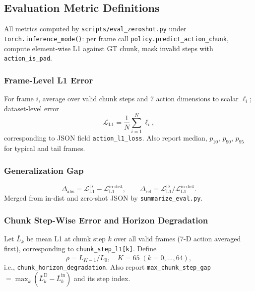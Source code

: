 \documentclass[10pt,twocolumn,letterpaper]{article}
\begin{document}
\subsection{Evaluation Metric Definitions}

All metrics computed by \texttt{scripts/eval\_zeroshot.py} under \texttt{torch.inference\_mode()}: per frame call \texttt{policy.predict\_action\_chunk}, compute element-wise L1 against GT chunk, mask invalid steps with \texttt{action\_is\_pad}.

\subsubsection{Frame-Level L1 Error}

For frame $i$, average over valid chunk steps and 7 action dimensions to scalar $\ell_i$; dataset-level error
\begin{equation}
  \mathcal{L}_{\mathrm{L1}} = \frac{1}{N}\sum_{i=1}^{N} \ell_i,
  \label{eq:l1}
\end{equation}
corresponding to JSON field \texttt{action\_l1\_loss}. Also report median, $p_{10}$, $p_{90}$, $p_{95}$ for typical and tail frames.

\subsubsection{Generalization Gap}

\begin{equation}
  \Delta_{\mathrm{abs}} = \mathcal{L}_{\mathrm{L1}}^{\mathrm{D}} - \mathcal{L}_{\mathrm{L1}}^{\mathrm{in\text{-}dist}},\qquad
  \Delta_{\mathrm{rel}} = \mathcal{L}_{\mathrm{L1}}^{\mathrm{D}} \big/ \mathcal{L}_{\mathrm{L1}}^{\mathrm{in\text{-}dist}}.
  \label{eq:gap}
\end{equation}
Merged from in-dist and zero-shot JSON by \texttt{summarize\_eval.py}.

\subsubsection{Chunk Step-Wise Error and Horizon Degradation}

Let $\bar{L}_k$ be mean L1 at chunk step $k$ over all valid frames (7-D action averaged first), corresponding to \texttt{chunk\_step\_l1[k]}. Define
\begin{equation}
  \rho = \bar{L}_{K-1} / \bar{L}_0,\quad K=65\;(k=0,\ldots,64),
  \label{eq:deg}
\end{equation}
i.e., \texttt{chunk\_horizon\_degradation}. Also report \texttt{max\_chunk\_step\_gap}$=\max_k(\bar{L}_k^{\mathrm{D}}-\bar{L}_k^{\mathrm{in}})$ and its step index.
\end{document}
